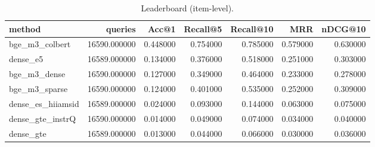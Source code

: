 \begin{table}
\caption{Leaderboard (item-level).}
\label{tab:lb_item}
\begin{tabular}{lrrrrrr}
\toprule
method & queries & Acc@1 & Recall@5 & Recall@10 & MRR & nDCG@10 \\
\midrule
bge_m3_colbert & 16590.000000 & 0.448000 & 0.754000 & 0.785000 & 0.579000 & 0.630000 \\
dense_e5 & 16589.000000 & 0.134000 & 0.376000 & 0.518000 & 0.251000 & 0.303000 \\
bge_m3_dense & 16590.000000 & 0.127000 & 0.349000 & 0.464000 & 0.233000 & 0.278000 \\
bge_m3_sparse & 16590.000000 & 0.124000 & 0.401000 & 0.535000 & 0.252000 & 0.309000 \\
dense_es_hiiamsid & 16589.000000 & 0.024000 & 0.093000 & 0.144000 & 0.063000 & 0.075000 \\
dense_gte_instrQ & 16590.000000 & 0.014000 & 0.049000 & 0.074000 & 0.034000 & 0.040000 \\
dense_gte & 16589.000000 & 0.013000 & 0.044000 & 0.066000 & 0.030000 & 0.036000 \\
\bottomrule
\end{tabular}
\end{table}
